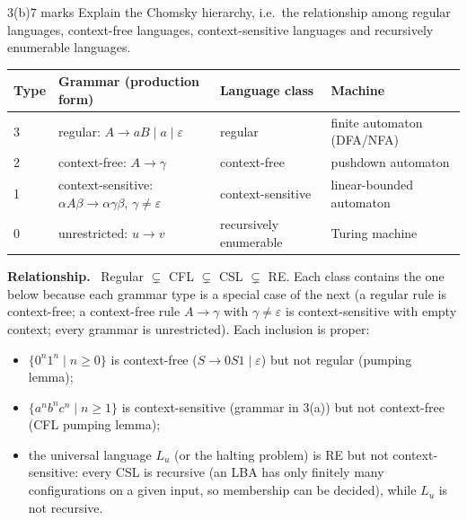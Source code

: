 \documentclass[10.5pt,a4paper]{article}
\newcommand{\ansh}[1]{\textbf{\color{exborder}#1}\ }
\newcommand{\eps}{\varepsilon}
\newcommand{\Lu}{L_u}
\begin{document}
\begin{qa}{3(b)}{7 marks}
Explain the Chomsky hierarchy, i.e.\ the relationship among regular languages, context-free languages, context-sensitive languages and
recursively enumerable languages.
\tcblower
\begin{center}\small
\begin{tabular}{@{}llll@{}}
\toprule
Type & Grammar (production form) & Language class & Machine\\\midrule
3 & regular: $A\to aB\mid a\mid\eps$ & regular & finite automaton (DFA/NFA)\\
2 & context-free: $A\to\gamma$ & context-free & pushdown automaton\\
1 & context-sensitive: $\alpha A\beta\to\alpha\gamma\beta$, $\gamma\ne\eps$ & context-sensitive & linear-bounded automaton\\
0 & unrestricted: $u\to v$ & recursively enumerable & Turing machine\\\bottomrule
\end{tabular}
\end{center}
\begin{center}
\end{center}
\ansh{Relationship.} Regular $\subsetneq$ CFL $\subsetneq$ CSL $\subsetneq$ RE. Each class contains the one below because each grammar type
is a special case of the next (a regular rule is context-free; a context-free rule $A\to\gamma$ with $\gamma\ne\eps$ is context-sensitive with
empty context; every grammar is unrestricted). Each inclusion is proper:
\begin{itemize}
\item $\{0^n1^n\mid n\ge0\}$ is context-free ($S\to0S1\mid\eps$) but not regular (pumping lemma);
\item $\{a^nb^nc^n\mid n\ge1\}$ is context-sensitive (grammar in 3(a)) but not context-free (CFL pumping lemma);
\item the universal language $\Lu$ (or the halting problem) is RE but not context-sensitive: every CSL is recursive (an LBA has only finitely
many configurations on a given input, so membership can be decided), while $\Lu$ is not recursive.
\end{itemize}
\end{qa}
\end{document}
